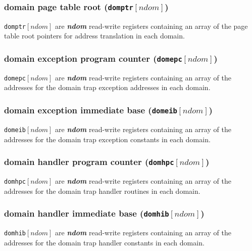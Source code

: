 \newpage
\subsubsection{domain page table root (\texttt{domptr}$[\mathit{ndom}]$)}
\texttt{domptr}$[\mathit{ndom}]$ are \textbf{\emph{ndom}} read-write
registers containing an array of the page table root pointers for
address translation in each domain.
\\

\subsubsection{domain exception program counter (\texttt{domepc}$[\mathit{ndom}]$)}
\texttt{domepc}$[\mathit{ndom}]$ are \textbf{\emph{ndom}} read-write
registers containing an array of the addresses for the domain trap exception
addresses in each domain.
\\

\subsubsection{domain exception immediate base (\texttt{domeib}$[\mathit{ndom}]$)}
\texttt{domeib}$[\mathit{ndom}]$ are \textbf{\emph{ndom}} read-write
registers containing an array of the addresses for the domain trap exception
constants in each domain.
\\

\subsubsection{domain handler program counter (\texttt{domhpc}$[\mathit{ndom}]$)}
\texttt{domhpc}$[\mathit{ndom}]$ are \textbf{\emph{ndom}} read-write
registers containing an array of the addresses for the domain trap handler
routines in each domain.
\\

\subsubsection{domain handler immediate base (\texttt{domhib}$[\mathit{ndom}]$)}
\texttt{domhib}$[\mathit{ndom}]$ are \textbf{\emph{ndom}} read-write
registers containing an array of the addresses for the domain trap handler
constants in each domain.
\\

